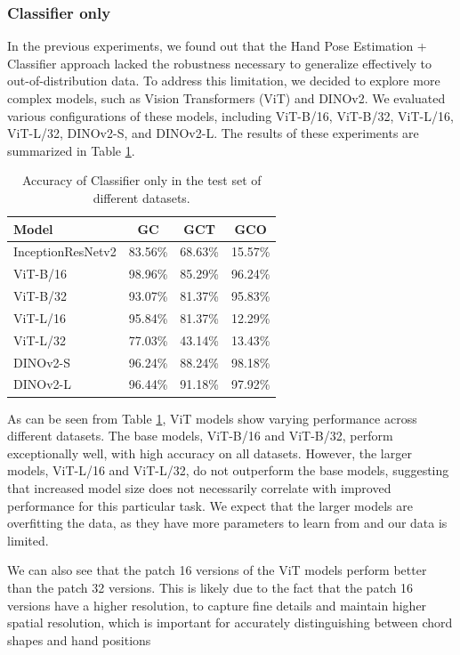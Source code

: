 \documentclass[10pt,twocolumn,letterpaper]{article}
\begin{document}
\subsubsection{Classifier only}
In the previous experiments, we found out that the Hand Pose Estimation + Classifier approach lacked the robustness necessary to generalize effectively to out-of-distribution data. To address this limitation, we decided to explore more complex models, such as Vision Transformers (ViT) and DINOv2. We evaluated various configurations of these models, including ViT-B/16, ViT-B/32, ViT-L/16, ViT-L/32, DINOv2-S, and DINOv2-L. The results of these experiments are summarized in Table \ref{tab:transformer-models-results}.

\begin{table}[h]
  \centering
  \begin{tabular}{lccc}
    \toprule
    \textbf{Model} & \textbf{GC} & \textbf{GCT} & \textbf{GCO} \\
    \midrule
    InceptionResNetv2 & 83.56\% & 68.63\% & 15.57\% \\
    \midrule
    ViT-B/16 & 98.96\% & 85.29\% & 96.24\% \\
    ViT-B/32 & 93.07\% & 81.37\% & 95.83\% \\
    ViT-L/16 & 95.84\% & 81.37\% & 12.29\% \\
    ViT-L/32 & 77.03\% & 43.14\% & 13.43\% \\
    DINOv2-S & 96.24\% & 88.24\% & 98.18\% \\
    DINOv2-L & 96.44\% & 91.18\% & 97.92\% \\
    \bottomrule
  \end{tabular}
  \caption{Accuracy of Classifier only in the test set of different datasets.}
  \label{tab:transformer-models-results}
\end{table}

As can be seen from Table \ref{tab:transformer-models-results}, ViT models show varying performance across different datasets. The base models, ViT-B/16 and ViT-B/32, perform exceptionally well, with high accuracy on all datasets. However, the larger models, ViT-L/16 and ViT-L/32, do not outperform the base models, suggesting that increased model size does not necessarily correlate with improved performance for this particular task. We expect that the larger models are overfitting the data, as they have more parameters to learn from and our data is limited.

We can also see that the patch 16 versions of the ViT models perform better than the patch 32 versions. This is likely due to the fact that the patch 16 versions have a higher resolution, to capture fine details and maintain higher spatial resolution, which is important for accurately distinguishing between chord shapes and hand positions
\end{document}
